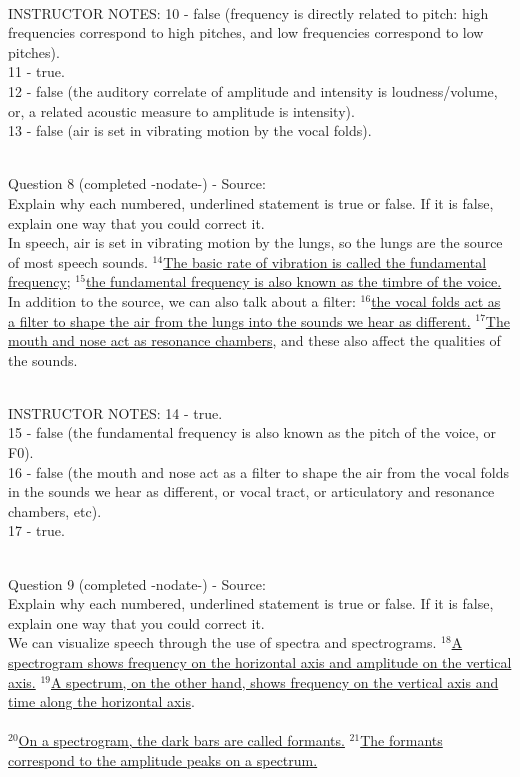 \documentclass[12pt]{article}
\begin{document}
~\\
INSTRUCTOR NOTES: 10 - false (frequency is directly related to pitch: high frequencies correspond to high pitches, and low frequencies correspond to low pitches).\\11 - true.\\12 - false (the auditory correlate of amplitude and intensity is loudness/volume, or, a related acoustic measure to amplitude is intensity).\\13 - false (air is set in vibrating motion by the vocal folds).


~\\

{\large Question 8} (completed -nodate-) - Source: \\

Explain why each numbered, underlined statement is true or false. If it is false, explain one way that you could correct it.\\

In speech, air is set in vibrating motion by the lungs, so the lungs are the source of most speech sounds. $^{14}$\ul{The basic rate of vibration is called the fundamental frequency}; $^{15}$\ul{the fundamental frequency is also known as the timbre of the voice.} In addition to the source, we can also talk about a filter: $^{16}$\ul{the vocal folds act as a filter to shape the air from the lungs into the sounds we hear as different.} $^{17}$\ul{The mouth and nose act as resonance chambers}, and these also affect the qualities of the sounds.


~\\
INSTRUCTOR NOTES: 14 - true.\\15 - false (the fundamental frequency is also known as the pitch of the voice, or F0).\\16 - false (the mouth and nose act as a filter to shape the air from the vocal folds in the sounds we hear as different, or vocal tract, or articulatory and resonance chambers, etc).\\17 - true.


~\\

{\large Question 9} (completed -nodate-) - Source: \\

Explain why each numbered, underlined statement is true or false. If it is false, explain one way that you could correct it.\\

We can visualize speech through the use of spectra and spectrograms. $^{18}$\ul{A spectrogram shows frequency on the horizontal axis and amplitude on the vertical axis.} $^{19}$\ul{A spectrum, on the other hand, shows frequency on the vertical axis and time along the horizontal axis}.\\\\$^{20}$\ul{On a spectrogram, the dark bars are called formants.} $^{21}$\ul{The formants correspond to the amplitude peaks on a spectrum.}
\end{document}
